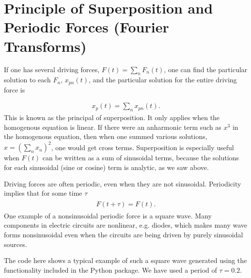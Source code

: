 \documentclass[letterpaper,10pt,english]{sphinxmanual}
\begin{document}
\section{Principle of Superposition and Periodic Forces (Fourier Transforms)}
\label{\detokenize{chapter1:principle-of-superposition-and-periodic-forces-fourier-transforms}}
If one has several driving forces, \(F(t)=\sum_n F_n(t)\), one can find
the particular solution to each \(F_n\), \(x_{pn}(t)\), and the particular
solution for the entire driving force is




\begin{equation*}
\begin{split}
\begin{equation}
x_p(t)=\sum_nx_{pn}(t).
\label{_auto61} \tag{80}
\end{equation}
\end{split}
\end{equation*}
This is known as the principal of superposition. It only applies when
the homogenous equation is linear. If there were an anharmonic term
such as \(x^3\) in the homogenous equation, then when one summed various
solutions, \(x=(\sum_n x_n)^2\), one would get cross
terms. Superposition is especially useful when \(F(t)\) can be written
as a sum of sinusoidal terms, because the solutions for each
sinusoidal (sine or cosine)  term is analytic, as we saw above.

Driving forces are often periodic, even when they are not
sinusoidal. Periodicity implies that for some time \(\tau\)
\begin{equation*}
\begin{split}
\begin{eqnarray}
F(t+\tau)=F(t). 
\end{eqnarray}
\end{split}
\end{equation*}
One example of a non\sphinxhyphen{}sinusoidal periodic force is a square wave. Many
components in electric circuits are non\sphinxhyphen{}linear, e.g. diodes, which
makes many wave forms non\sphinxhyphen{}sinusoidal even when the circuits are being
driven by purely sinusoidal sources.

The code here shows a typical example of such a square wave generated using the functionality included in the  Python package. We have used a period of \(\tau=0.2\).
\end{document}
